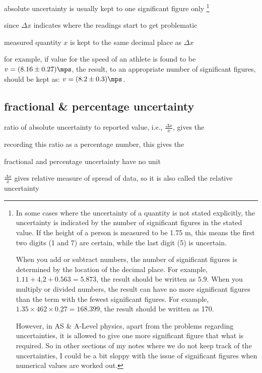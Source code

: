 \cmt absolute uncertainty is usually kept to one significant figure only
\footnote{In some cases where the uncertainty of a quantity is not stated explicitly, the uncertainty is indicated by the number of significant figures in the stated value. If the height of a person is measured to be 1.75 m, this means the first two digits (1 and 7) are certain, while the last digit (5) is uncertain.
	
	When you add or subtract numbers, the number of significant figures is determined by the location of the decimal place. For example, $1.11+\underline{4.2}+0.563=5.873$, the result should be written as $5.9$. When you multiply or divided numbers, the result can have no more significant figures than the term with the fewest significant figures. For example, $1.35\times462\times\underline{0.27} = 168.399$, the result should be written as 170.
	
	However, in AS \& A-Level physics, apart from the problems regarding uncertainties, it is allowed to give one more significant figure that what is required. So in other sections of my notes where we do not keep track of the uncertainties, I could be a bit sloppy with the issue of significant figures when numerical values are worked out.}

since $\Delta x$ indicates where the readings start to get problematic

measured quantity $x$ is kept to the same decimal place as $\Delta x$

for example, if value for the speed of an athlete is found to be $v=(8.16\pm0.27)\mps$, the result, to an appropriate number of significant figures, should be kept as: $v=(8.2\pm0.3) \mps$.



\subsection{fractional \& percentage uncertainty}

ratio of absolute uncertainty to reported value, i.e., $\frac{\Delta x}{x}$, gives the 

recording this ratio as a percentage number, this gives the 

\cmt fractional and percentage uncertainty have no unit

\cmt $\frac{\Delta x}{x}$ gives relative measure of spread of data, so it is also called the relative uncertainty

